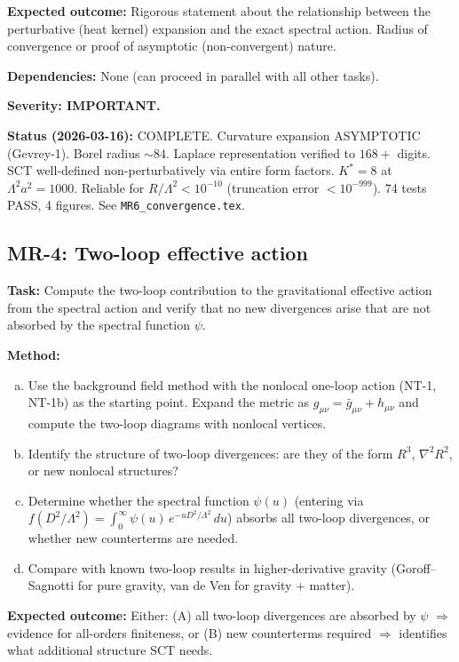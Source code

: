 \documentclass[12pt,a4paper]{article}
\newcommand{\task}[1]{\noindent\textbf{Task:} #1\par}
\newcommand{\method}[1]{\noindent\textbf{Method:} #1\par}
\newcommand{\outcome}[1]{\noindent\textbf{Expected outcome:} #1\par}
\newcommand{\deps}[1]{\noindent\textbf{Dependencies:} #1\par}
\begin{document}
\outcome{Rigorous statement about the relationship between the perturbative
(heat kernel) expansion and the exact spectral action. Radius of convergence
or proof of asymptotic (non-convergent) nature.}

\deps{None (can proceed in parallel with all other tasks).}

\textbf{Severity: IMPORTANT.}

\textbf{Status (2026-03-16):} \textcolor{proven}{COMPLETE.}
Curvature expansion ASYMPTOTIC (Gevrey-1).
Borel radius $\sim 84$.
Laplace representation verified to $168{+}$ digits.
SCT well-defined non-perturbatively via entire form factors.
$K^* = 8$ at $\Lambda^2 a^2 = 1000$.
Reliable for $R/\Lambda^2 < 10^{-10}$ (truncation error $< 10^{-999}$).
74 tests PASS, 4 figures.
See \texttt{MR6\_convergence.tex}.

\subsection{MR-4: Two-loop effective action}
\label{task:MR4}

\task{Compute the two-loop contribution to the gravitational effective action
from the spectral action and verify that no new divergences arise that are
not absorbed by the spectral function $\psi$.}

\method{
\begin{enumerate}[(a)]
  \item Use the background field method with the nonlocal one-loop action
    (NT-1, NT-1b) as the starting point. Expand the metric as
    $g_{\mu\nu} = \bar{g}_{\mu\nu} + h_{\mu\nu}$ and compute the
    two-loop diagrams with nonlocal vertices.
  \item Identify the structure of two-loop divergences: are they of the
    form $R^3$, $\nabla^2 R^2$, or new nonlocal structures?
  \item Determine whether the spectral function $\psi(u)$ (entering via
    $f(D^2/\Lambda^2) = \int_0^\infty \psi(u)\,e^{-uD^2/\Lambda^2}\,du$)
    absorbs all two-loop divergences, or whether new counterterms are needed.
  \item Compare with known two-loop results in higher-derivative gravity
    (Goroff--Sagnotti for pure gravity, van de Ven for gravity + matter).
\end{enumerate}
}

\outcome{Either: (A) all two-loop divergences are absorbed by $\psi$
$\Rightarrow$ evidence for all-orders finiteness, or (B) new counterterms
required $\Rightarrow$ identifies what additional structure SCT needs.}
\end{document}
